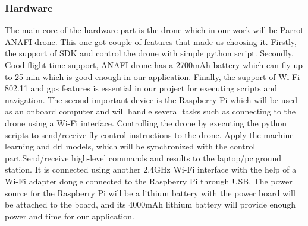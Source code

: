\documentclass[../main.tex]{subfiles}
\begin{document}
\subsubsection{Hardware}
The main core of the hardware part is the drone which in our work will be Parrot ANAFI drone. This one got couple of features that made us choosing it. Firstly, the support of SDK and control the drone with simple python script. Secondly, Good flight time support, ANAFI drone has a 2700mAh battery which can fly up to 25 min which is good enough in our application. Finally, the support of Wi-Fi 802.11 and \gls{gps} features is essential in our project for executing scripts and navigation. The second important device is the Raspberry Pi which will be used as an onboard computer and will handle several tasks such as connecting to the drone using a Wi-Fi interface. Controlling the drone by executing the python scripts to send/receive fly control instructions to the drone. Apply the machine learning and \gls{drl} models, which will be synchronized with the control part.Send/receive high-level commands and results to the laptop/pc ground station. It is connected using another 2.4GHz Wi-Fi interface with the help of a Wi-Fi adapter dongle connected to the Raspberry Pi through USB. The power source for the Raspberry Pi will be a lithium battery with the power board will be attached to the board, and its 4000mAh lithium battery will provide enough power and time for our application.      
\end{document}
